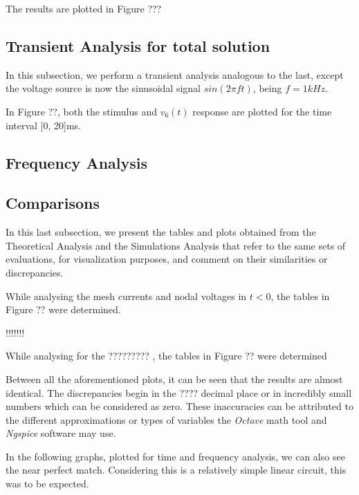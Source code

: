The results are plotted in Figure ???

\subsection{Transient Analysis for total solution}
\label{subsec:trans_total}

In this subsection, we perform a transient analysis analogous to the last, except the voltage source is now the sinusoidal signal $sin(2 \pi f t)$, being $f = 1kHz$.

In Figure ??, both the stimulus and $v_6(t)$ response are plotted for the time interval [0, 20]ms.


\subsection{Frequency Analysis}
\label{subsec:freq_sim}



\subsection{Comparisons}

In this last subsection, we present the tables and plots obtained from the Theoretical Analysis and the Simulations Analysis that refer to the same sets of evaluations, for visualization purposes, and comment on their similarities or discrepancies.

While analysing the mesh currents and nodal voltages in $t<0$, the tables in Figure ?? were determined.

!!!!!!!

While analysing for the ????????? , the tables in Figure ?? were determined


Between all the aforementioned plots, it can be seen that the results are almost identical. The discrepancies begin in the ???? decimal place or in incredibly small numbers which can be considered as zero. These inaccuracies can be attributed to the different approximations or types of variables the \textit{Octave} math tool and \textit{Ngspice} software may use.

In the following graphs, plotted for time and frequency analysis, we can also see the near perfect match. Considering this is a relatively simple linear circuit, this was to be expected.
